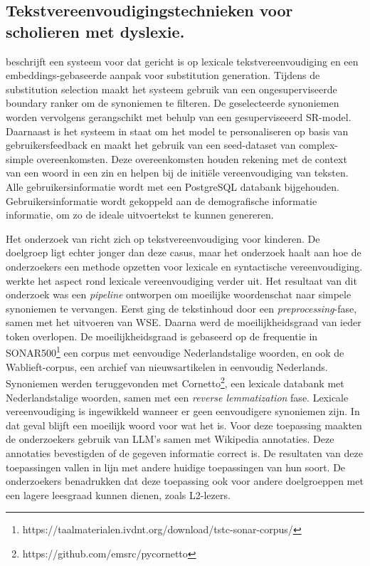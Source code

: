 \subsection{Tekstvereenvoudigingstechnieken voor scholieren met dyslexie.}

\textcite{Bingel2018} beschrijft een systeem voor dat gericht is op lexicale tekstvereenvoudiging en een embeddings-gebaseerde aanpak voor substitution generation. Tijdens de substitution selection maakt het systeem gebruik van een ongesuperviseerde boundary ranker om de synoniemen te filteren. De geselecteerde synoniemen worden vervolgens gerangschikt met behulp van een gesuperviseeerd SR-model. Daarnaast is het systeem in staat om het model te personaliseren op basis van gebruikersfeedback en maakt het gebruik van een seed-dataset van complex-simple overeenkomsten. Deze overeenkomsten houden rekening met de context van een woord in een zin en helpen bij de initiële vereenvoudiging van teksten. Alle gebruikersinformatie wordt met een PostgreSQL databank bijgehouden. Gebruikersinformatie wordt gekoppeld aan de demografische informatie informatie, om zo de ideale uitvoertekst te kunnen genereren. 

Het onderzoek van \textcite{DeBelder2010} richt zich op tekstvereenvoudiging voor kinderen. De doelgroep ligt echter jonger dan deze casus, maar het onderzoek haalt aan hoe de onderzoekers een methode opzetten voor lexicale en syntactische vereenvoudiging. \textcite{Bulte2018} werkte het aspect rond lexicale vereenvoudiging verder uit. Het resultaat van dit onderzoek was een \textit{pipeline} ontworpen om moeilijke woordenschat naar simpele synoniemen te vervangen. Eerst ging de tekstinhoud door een \textit{preprocessing}-fase, samen met het uitvoeren van WSE. Daarna werd de moeilijkheidsgraad van ieder token overlopen. De moeilijkheidsgraad is gebaseerd op de frequentie in SONAR500\footnote{https://taalmaterialen.ivdnt.org/download/tstc-sonar-corpus/} een corpus met eenvoudige Nederlandstalige woorden, en ook de Wablieft-corpus, een archief van nieuwsartikelen in eenvoudig Nederlands. Synoniemen werden teruggevonden met Cornetto\footnote{https://github.com/emsrc/pycornetto}, een lexicale databank met Nederlandstalige woorden, samen met een \textit{reverse lemmatization} fase. Lexicale vereenvoudiging is ingewikkeld wanneer er geen eenvoudigere synoniemen zijn. In dat geval blijft een moeilijk woord voor wat het is. Voor deze toepassing maakten de onderzoekers gebruik van LLM's samen met Wikipedia annotaties. Deze annotaties bevestigden of de gegeven informatie correct is. De resultaten van deze toepassingen vallen in lijn met andere huidige toepassingen van hun soort. De onderzoekers benadrukken dat deze toepassing ook voor andere doelgroeppen met een lagere leesgraad kunnen dienen, zoals L2-lezers.


